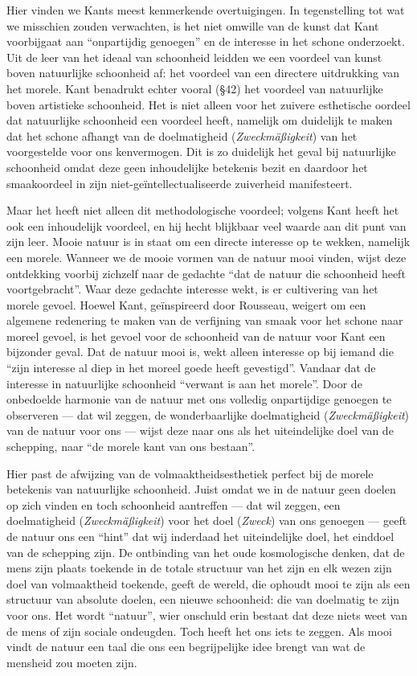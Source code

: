 Hier vinden we Kants meest kenmerkende overtuigingen. In tegenstelling tot wat we misschien zouden verwachten, is het niet omwille van de kunst dat Kant voorbijgaat aan ``onpartijdig genoegen'' en de interesse in het schone onderzoekt. Uit de leer van het ideaal van schoonheid leidden we een voordeel van kunst boven natuurlijke schoonheid af: het voordeel van een directere uitdrukking van het morele. Kant benadrukt echter vooral (§42) het voordeel van natuurlijke boven artistieke schoonheid. Het is niet alleen voor het zuivere esthetische oordeel dat natuurlijke schoonheid een voordeel heeft, namelijk om duidelijk te maken dat het schone afhangt van de doelmatigheid (\textit{Zweckmäßigkeit}) van het voorgestelde voor ons kenvermogen. Dit is zo duidelijk het geval bij natuurlijke schoonheid omdat deze geen inhoudelijke betekenis bezit en daardoor het smaakoordeel in zijn niet-geïntellectualiseerde zuiverheid manifesteert.

Maar het heeft niet alleen dit methodologische voordeel; volgens Kant heeft het ook een inhoudelijk voordeel, en hij hecht blijkbaar veel waarde aan dit punt van zijn leer. Mooie natuur is in staat om een directe interesse op te wekken, namelijk een morele. Wanneer we de mooie vormen van de natuur mooi vinden, wijst deze ontdekking voorbij zichzelf naar de gedachte ``dat de natuur die schoonheid heeft voortgebracht''. Waar deze gedachte interesse wekt, is er cultivering van het morele gevoel. Hoewel Kant, geïnspireerd door Rousseau, weigert om een algemene redenering te maken van de verfijning van smaak voor het schone naar moreel gevoel, is het gevoel voor de schoonheid van de natuur voor Kant een bijzonder geval. Dat de natuur mooi is, wekt alleen interesse op bij iemand die ``zijn interesse al diep in het moreel goede heeft gevestigd''. Vandaar dat de interesse in natuurlijke schoonheid ``verwant is aan het morele''. Door de onbedoelde harmonie van de natuur met ons volledig onpartijdige genoegen te observeren — dat wil zeggen, de wonderbaarlijke doelmatigheid (\textit{Zweckmäßigkeit}) van de natuur voor ons — wijst deze naar ons als het uiteindelijke doel van de schepping, naar ``de morele kant van ons bestaan''.

Hier past de afwijzing van de volmaaktheidsesthetiek perfect bij de morele betekenis van natuurlijke schoonheid. Juist omdat we in de natuur geen doelen op zich vinden en toch schoonheid aantreffen — dat wil zeggen, een doelmatigheid (\textit{Zweckmäßigkeit}) voor het doel (\textit{Zweck}) van ons genoegen — geeft de natuur ons een ``hint'' dat wij inderdaad het uiteindelijke doel, het einddoel van de schepping zijn. De ontbinding van het oude kosmologische denken, dat de mens zijn plaats toekende in de totale structuur van het zijn en elk wezen zijn doel van volmaaktheid toekende, geeft de wereld, die ophoudt mooi te zijn als een structuur van absolute doelen, een nieuwe schoonheid: die van doelmatig te zijn voor ons. Het wordt ``natuur'', wier onschuld erin bestaat dat deze niets weet van de mens of zijn sociale ondeugden. Toch heeft het ons iets te zeggen. Als mooi vindt de natuur een taal die ons een begrijpelijke idee brengt van wat de mensheid zou moeten zijn.

